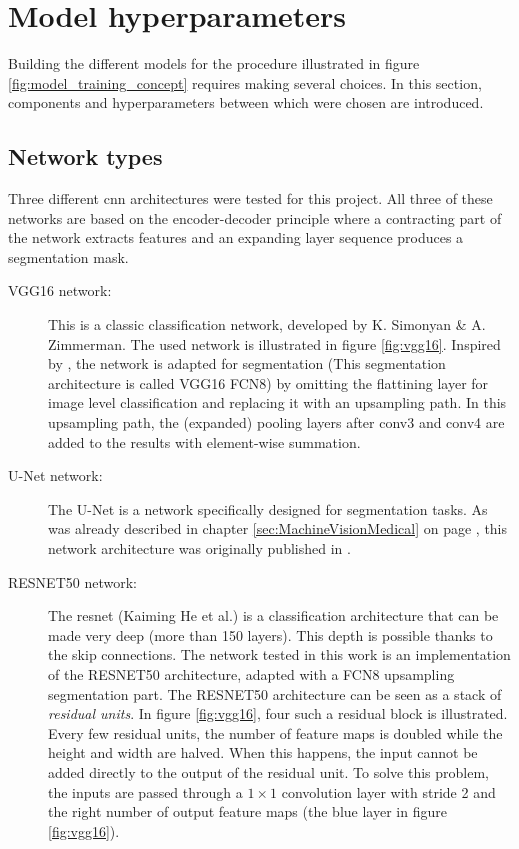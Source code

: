 \section{Model hyperparameters}

Building the different models for the procedure illustrated in figure \ref{fig:model_training_concept} requires making several choices.
In this section, components and hyperparameters between which were chosen are introduced.

\subsection{Network types\label{sec:network_types}}

Three different \acrlong{cnn} architectures were tested for this project.
All three of these networks are based on the encoder-decoder principle where a contracting part of the network extracts \Gls{features} and an expanding layer sequence produces a segmentation mask.

\begin{description}
    \item[VGG16 network: ] This is a classic classification network, developed by K. Simonyan \& A. Zimmerman. 
    The used network is illustrated in figure \ref{fig:vgg16}. 
    Inspired by \cite{Laradji2021}, the network is adapted for segmentation (This segmentation architecture is called VGG16 FCN8) by omitting the flattining layer for image level classification and 
    replacing it with an upsampling path. In this upsampling path, the (expanded) pooling layers after conv3 and conv4 are added to the results with element-wise summation.
    \item[U-Net network: ] The U-Net is a network specifically designed for segmentation tasks. As was already described in chapter \ref{sec:MachineVisionMedical} on page \pageref{sec:MachineVisionMedical}, 
    this network architecture was originally published in \cite{Ronneberger2015}.
    \item[RESNET50 network:] The \Gls{resnet} (Kaiming He et al.) is a classification architecture that can be made very deep (more than 150 layers).
    This depth is possible thanks to the skip connections. The network tested in this work is an implementation of the RESNET50 architecture, adapted with a FCN8 upsampling segmentation part.
    The RESNET50 architecture can be seen as a stack of \textit{residual units}. In figure \ref{fig:vgg16}, four such a residual block is illustrated.
    Every few residual units, the number of feature maps is doubled while the height and width are halved. When this happens, the input cannot be added directly to the output of the residual unit.
    To solve this problem, the inputs are passed through a $1\times 1$ convolution layer with stride 2 and the right number of output feature maps (the blue layer in figure \ref{fig:vgg16}).
\end{description}

